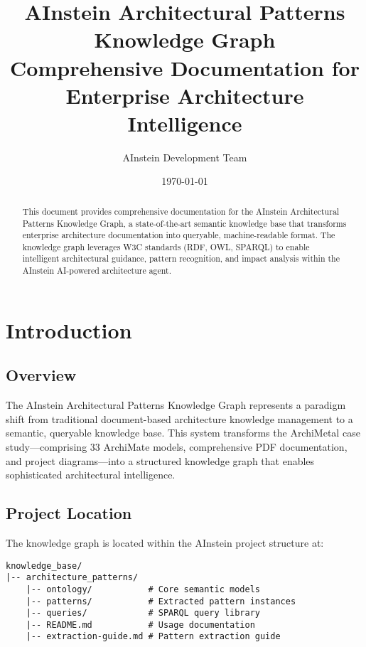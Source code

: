 \documentclass[12pt,a4paper]{article}
\title{\textbf{AInstein Architectural Patterns Knowledge Graph}\\
\large{Comprehensive Documentation for Enterprise Architecture Intelligence}}
\author{AInstein Development Team}
\date{\today}
\begin{document}
\maketitle

\begin{abstract}
This document provides comprehensive documentation for the AInstein Architectural Patterns Knowledge Graph, a state-of-the-art semantic knowledge base that transforms enterprise architecture documentation into queryable, machine-readable format. The knowledge graph leverages W3C standards (RDF, OWL, SPARQL) to enable intelligent architectural guidance, pattern recognition, and impact analysis within the AInstein AI-powered architecture agent.
\end{abstract}

\tableofcontents
\newpage

\section{Introduction}

\subsection{Overview}
The AInstein Architectural Patterns Knowledge Graph represents a paradigm shift from traditional document-based architecture knowledge management to a semantic, queryable knowledge base. This system transforms the ArchiMetal case study---comprising 33 ArchiMate models, comprehensive PDF documentation, and project diagrams---into a structured knowledge graph that enables sophisticated architectural intelligence.

\subsection{Project Location}
The knowledge graph is located within the AInstein project structure at:

\begin{verbatim}
knowledge_base/
|-- architecture_patterns/
    |-- ontology/           # Core semantic models
    |-- patterns/           # Extracted pattern instances
    |-- queries/            # SPARQL query library
    |-- README.md           # Usage documentation
    |-- extraction-guide.md # Pattern extraction guide
\end{verbatim}
\end{document}
